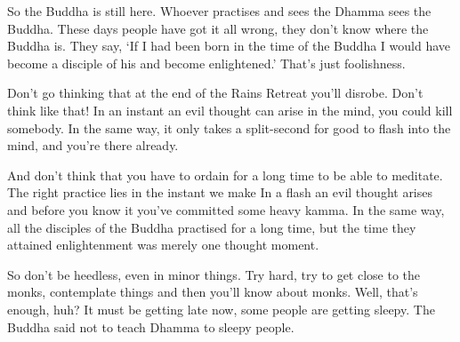 So the Buddha is still here. Whoever practises and sees the Dhamma sees the Buddha. These days people have got it all wrong, they don't know where the Buddha is. They say, `If I had been born in the time of the Buddha I would have become a disciple of his and become enlightened.' That's just foolishness. 

Don't go thinking that at the end of the Rains Retreat you'll disrobe. Don't think like that! In an instant an evil thought can arise in the mind, you could kill somebody. In the same way, it only takes a split-second for good to flash into the mind, and you're there already. 

And don't think that you have to ordain for a long time to be able to meditate. The right practice lies in the instant we make  In a flash an evil thought arises and before you know it you've committed some heavy kamma. In the same way, all the disciples of the Buddha practised for a long time, but the time they attained enlightenment was merely one thought moment. 

So don't be heedless, even in minor things. Try hard, try to get close to the monks, contemplate things and then you'll know about monks. Well, that's enough, huh? It must be getting late now, some people are getting sleepy. The Buddha said not to teach Dhamma to sleepy people. 


